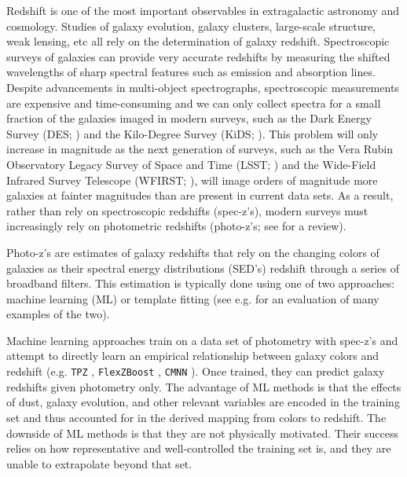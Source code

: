 
Redshift is one of the most important observables in extragalactic astronomy and cosmology.
Studies of galaxy evolution, galaxy clusters, large-scale structure, weak lensing, etc all rely on the determination of galaxy redshift.
Spectroscopic surveys of galaxies can provide very accurate redshifts by measuring the shifted wavelengths of sharp spectral features such as emission and absorption lines.
Despite advancements in multi-object spectrographs, spectroscopic measurements are expensive and time-consuming and we can only collect spectra for a small fraction of the galaxies imaged in modern surveys, such as the Dark Energy Survey (DES; \citealt{TheDarkEnergySurveyCollaboration2005}) and the Kilo-Degree Survey (KiDS; \citealt{DeJong2013a}).
This problem will only increase in magnitude as the next generation of surveys, such as the Vera Rubin Observatory Legacy Survey of Space and Time (LSST; \citealt{LSSTScienceCollaboration2009}) and the Wide-Field Infrared Survey Telescope (WFIRST; \citealt{Green2012}), will image orders of magnitude more galaxies at fainter magnitudes than are present in current data sets.
As a result, rather than rely on spectroscopic redshifts (spec-z's), modern surveys must increasingly rely on photometric redshifts (photo-z's; see \citealt{Salvato2019} for a review).

Photo-z's are estimates of galaxy redshifts that rely on the changing colors of galaxies as their spectral energy distributions (SED's) redshift through a series of broadband filters.
This estimation is typically done using one of two approaches: machine learning (ML) or template fitting (see e.g. \citealt{Schmidt2020} for an evaluation of many examples of the two).

Machine learning approaches train on a data set of photometry with spec-z's and attempt to directly learn an empirical relationship between galaxy colors and redshift (e.g. \texttt{TPZ} \citealt{Kind2013}, \texttt{FlexZBoost} \citealt{Izbicki2017}, \texttt{CMNN} \citealt{Graham2018a}).
Once trained, they can predict galaxy redshifts given photometry only.
The advantage of ML methods is that the effects of dust, galaxy evolution, and other relevant variables are encoded in the training set and thus accounted for in the derived mapping from colors to redshift.
The downside of ML methods is that they are not physically motivated.
Their success relies on how representative and well-controlled the training set is, and they are unable to extrapolate beyond that set.

